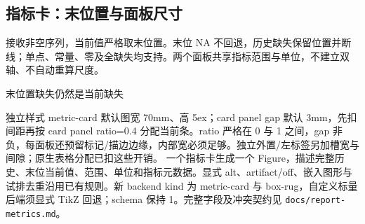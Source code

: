 \subsection{指标卡：末位置与面板尺寸}
 接收非空序列，当前值严格取末位置。末位 NA 不回退，历史缺失保留位置并断线；单点、常量、零及全缺失均支持。两个面板共享指标范围与单位，不建立双轴、不自动重算尺度。
\begin{example}[text and listing,sidebyside=false]{末位置缺失仍然是当前缺失}
\begingroup
{}
\begin{gradtable}[style=metric-report,width=\linewidth]
\end{gradtable}
\endgroup
\end{example}
独立样式 metric-card 默认图宽 70mm、高 5ex；card panel gap 默认 3mm，先扣间距再按 card panel ratio=0.4 分配当前条。ratio 严格在 0 与 1 之间，gap 非负，每面板还预留标记/描边边缘，内部宽必须足够。独立外置/左标签另加槽宽与间隙；原生表格分配已扣这些开销。
一个指标卡生成一个 Figure，描述完整历史、末位当前值、范围、单位和指标元数据。显式 alt、artifact/off、嵌入图形与试排去重沿用已有规则。新 backend kind 为 metric-card 与 box-rug，自定义标量后端须显式 TikZ 回退；schema 保持 1。完整字段及冲突契约见 \texttt{docs/report-metrics.md}。
